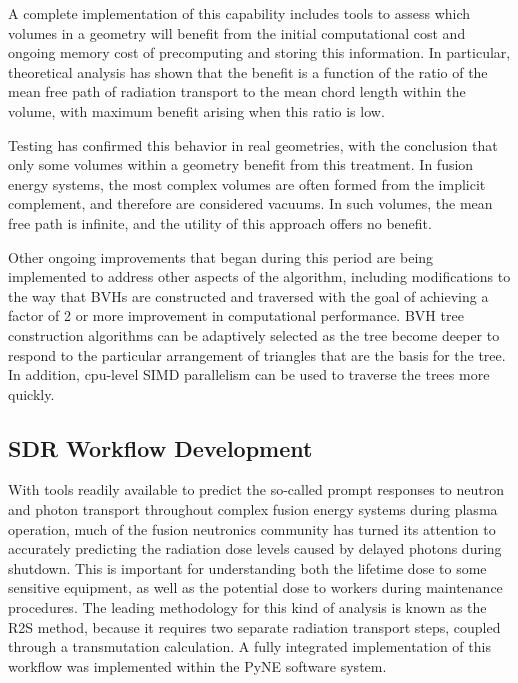 A complete implementation of this capability includes tools to assess which
volumes in a geometry will benefit from the initial computational cost and
ongoing memory cost of precomputing and storing this information.  In
particular, theoretical analysis has shown that the benefit is a function of
the ratio of the mean free path of radiation transport to the mean chord
length within the volume, with maximum benefit arising when this ratio is
low\cite{shriwise_NET}.

Testing has confirmed this behavior in real geometries, with the conclusion
that only some volumes within a geometry benefit from this treatment.  In
fusion energy systems, the most complex volumes are often formed from the
implicit complement, and therefore are considered vacuums.  In such volumes,
the mean free path is infinite, and the utility of this approach offers no
benefit.

Other ongoing improvements that began during this period are being implemented
to address other aspects of the algorithm, including modifications to the way
that \glspl{BVH} are constructed and traversed with the goal of achieving a
factor of 2 or more improvement in computational performance.  \gls{BVH} tree
construction algorithms can be adaptively selected as the tree become deeper
to respond to the particular arrangement of triangles that are the basis for
the tree.  In addition, cpu-level \gls{SIMD} parallelism can be used to
traverse the trees more quickly.

\subsection{\gls{SDR} Workflow Development}

With tools readily available to predict the so-called prompt responses to
neutron and photon transport throughout complex fusion energy systems during
plasma operation, much of the fusion neutronics community has turned its
attention to accurately predicting the radiation dose levels caused by delayed
photons during shutdown.  This is important for understanding both the
lifetime dose to some sensitive equipment, as well as the potential dose to
workers during maintenance procedures.  The leading methodology for this kind
of analysis is known as the \gls{R2S} method, because it requires two separate
radiation transport steps, coupled through a transmutation
calculation\cite{various_r2s}.  A fully integrated implementation of this
workflow was implemented within the PyNE software system\cite{pyne}.

